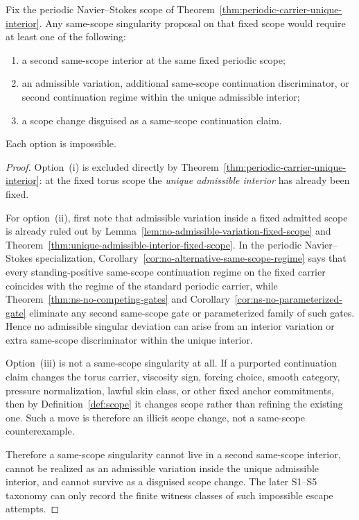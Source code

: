 \begin{theorem}\label{thm:uniqueness-first-contradiction}
Fix the periodic Navier--Stokes scope of Theorem~\ref{thm:periodic-carrier-unique-interior}. Any same-scope singularity proposal on that fixed scope would require at least one of the following:
\begin{enumerate}[label=(\roman*), leftmargin=2.2em]
\item a second same-scope interior at the same fixed periodic scope;
\item an admissible variation, additional same-scope continuation discriminator, or second continuation regime within the unique admissible interior;
\item a scope change disguised as a same-scope continuation claim.
\end{enumerate}
Each option is impossible.
\end{theorem}

\begin{proof}
Option~(i) is excluded directly by Theorem~\ref{thm:periodic-carrier-unique-interior}: at the fixed torus scope the \emph{unique admissible interior} has already been fixed.

For option~(ii), first note that admissible variation inside a fixed admitted scope is already ruled out by Lemma~\ref{lem:no-admissible-variation-fixed-scope} and Theorem~\ref{thm:unique-admissible-interior-fixed-scope}. In the periodic Navier--Stokes specialization, Corollary~\ref{cor:no-alternative-same-scope-regime} says that every standing-positive same-scope continuation regime on the fixed carrier coincides with the regime of the standard periodic carrier, while Theorem~\ref{thm:ns-no-competing-gates} and Corollary~\ref{cor:ns-no-parameterized-gate} eliminate any second same-scope gate or parameterized family of such gates. Hence no admissible singular deviation can arise from an interior variation or extra same-scope discriminator within the unique interior.

Option~(iii) is not a same-scope singularity at all. If a purported continuation claim changes the torus carrier, viscosity sign, forcing choice, smooth category, pressure normalization, lawful skin class, or other fixed anchor commitments, then by Definition~\ref{def:scope} it changes scope rather than refining the existing one. Such a move is therefore an illicit scope change, not a same-scope counterexample.

Therefore a same-scope singularity cannot live in a second same-scope interior, cannot be realized as an admissible variation inside the unique admissible interior, and cannot survive as a disguised scope change. The later S1--S5 taxonomy can only record the finite witness classes of such impossible escape attempts.
\end{proof}

